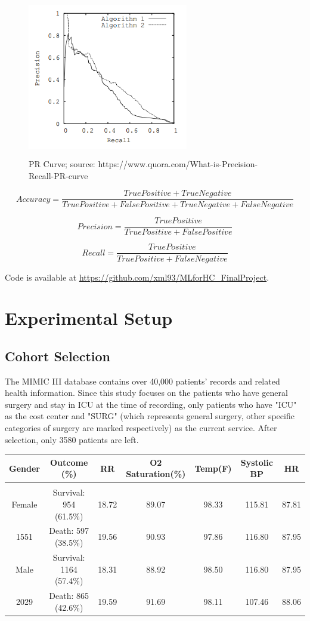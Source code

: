 \documentclass[twoside,11pt]{article}
\begin{document}
\begin{figure}[htbp]
  \centering 
  \includegraphics[height=7cm, width=7cm]{fig3} 
  \caption{PR Curve; source: https://www.quora.com/What-is-Precision-Recall-PR-curve}
  \label{fig3} 
\end{figure} 

\[Accuracy = \frac{True Positive + True Negative}{True Positive + False Positive + True Negative +False Negative}\]

\[Precision = \frac{True Positive}{True Positive + False Positive}\]

\[Recall = \frac{True Positive}{True Positive + False Negative}\]

Code is available at \url{https://github.com/xml93/MLforHC_FinalProject}.

\section{Experimental Setup} \label{experiment}

\subsection{Cohort Selection} 
The MIMIC III database contains over 40,000 patients' records and related health information. Since this study focuses on the patients who have general surgery and stay in ICU at the time of recording, only patients who have "ICU" as the cost center and "SURG" (which represents general surgery, other specific categories of surgery are marked respectively) as the current service. After selection, only 3580 patients are left. 

\begin{table}[htbp]
  \centering 
  \begin{tabular}{|c|c|c|c|c|c|c|} 
    Gender & Outcome (\%) & RR & O2 Saturation(\%) & Temp(F) & Systolic BP & HR\\ 
    \hline \\[-11pt]
    Female & Survival: 954 (61.5\%) & 18.72 & 89.07 & 98.33 & 115.81 & 87.81\\ 
    1551 & Death: 597 (38.5\%) & 19.56 & 90.93 & 97.86 & 116.80 & 87.95\\ 
    Male & Survival: 1164 (57.4\%) & 18.31 & 88.92 & 98.50 & 116.80 & 87.95\\
    2029 & Death: 865 (42.6\%) & 19.59 & 91.69 & 98.11 & 107.46 & 88.06\\ \hline 
  \end{tabular}
\end{table}
\end{document}

